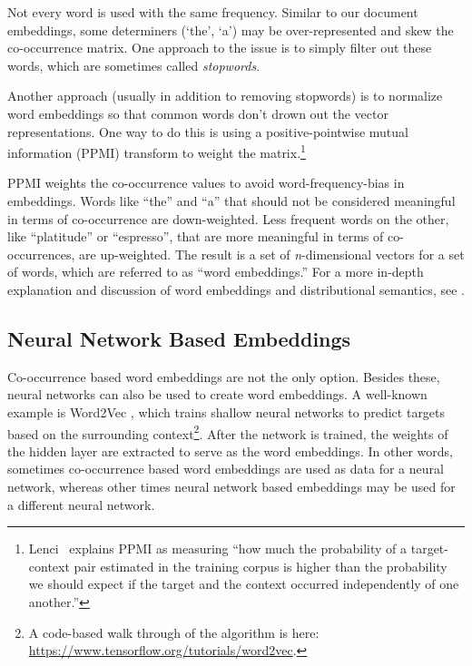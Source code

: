 Not every word is used with the same frequency. Similar to our document embeddings, some determiners (`the', `a') may be over-represented and skew the co-occurrence matrix. One approach to the issue is to simply filter out these words, which are sometimes called  \emph{stopwords}.

Another approach (usually in addition to removing stopwords) is to normalize word embeddings so that common words don't drown out the vector representations. One way to do this is using a positive-pointwise mutual information (PPMI) transform to weight the matrix.\footnote{ Lenci~\cite{lenci2018distributional} explains PPMI as measuring ``how much the probability of a target-context pair estimated in the training corpus is higher than the probability we should expect if the target and the context occurred independently of one another.''}

PPMI weights the co-occurrence values to avoid word-frequency-bias in embeddings. Words like ``the'' and ``a'' that should not be considered meaningful in terms of co-occurrence are down-weighted. Less frequent words on the other, like ``platitude'' or ``espresso'', that are more meaningful in terms of co-occurrences, are up-weighted. The result is a set of \textit{n}-dimensional vectors for a set of words, which are referred to as ``word embeddings.'' For a more in-depth explanation and discussion of word embeddings and distributional semantics, see \cite{lenci2018distributional}.


\subsection{Neural Network Based Embeddings}\label{createWordEmbeddings}

Co-occurrence based word embeddings are not the only option. Besides these, neural networks can also be used to create word embeddings. A well-known example is Word2Vec \cite{mikolov2013distributed}, which trains shallow neural networks to predict targets based on the surrounding context\footnote{A code-based walk through of the algorithm is here:  \url{https://www.tensorflow.org/tutorials/word2vec}.}. After the network is trained, the weights of the hidden layer are extracted to serve as the word embeddings. In other words, sometimes co-occurrence based word embeddings are used as data for a neural network, whereas other times neural network based embeddings may be used for a different neural network.

